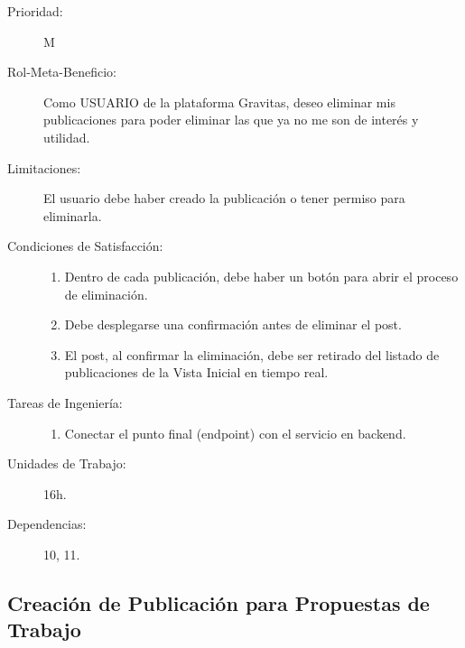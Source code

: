 \begin{description}
    \item[Prioridad:] M
    \item[Rol-Meta-Beneficio:]  Como USUARIO de la plataforma Gravitas, deseo  eliminar mis publicaciones para poder eliminar las que ya no me son de interés y utilidad.
    \item[Limitaciones:]  El usuario debe haber creado la publicación o tener permiso para eliminarla.
    \item[Condiciones de Satisfacción:]  \hfill
        \begin{enumerate}
            \item Dentro de cada publicación, debe haber un botón para abrir el proceso de eliminación.
    		\item Debe desplegarse una confirmación antes de eliminar el post.
	        \item El post, al confirmar la eliminación, debe ser retirado del listado de publicaciones de la Vista Inicial en tiempo real.
        \end{enumerate}
    \item[Tareas de Ingeniería:]  \hfill
        \begin{enumerate}
            \item Conectar el punto final (endpoint) con el servicio en backend.
        \end{enumerate}
    \item[Unidades de Trabajo:] 16h.
    \item[Dependencias:] 10, 11.
\end{description}

\newpage


\subsection{Creación de Publicación para Propuestas de Trabajo}


